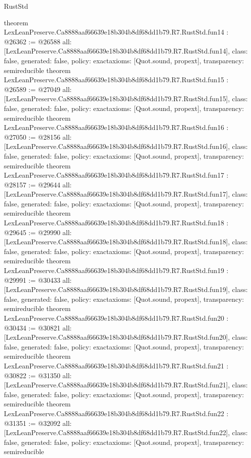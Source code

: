\begin{lexlean}{RustStd}
\begin{coremodule}
{}
theorem LexLeanPreserve.Ca8888aaf66639e18b304b8df68dd1b79.R7.RustStd.fun14 : @26362 := @26588 {
  all: [LexLeanPreserve.Ca8888aaf66639e18b304b8df68dd1b79.R7.RustStd.fun14],
  class: false,
  generated: false,
  policy: exact{axioms: [Quot.sound, propext]},
  transparency: semireducible
}
theorem LexLeanPreserve.Ca8888aaf66639e18b304b8df68dd1b79.R7.RustStd.fun15 : @26589 := @27049 {
  all: [LexLeanPreserve.Ca8888aaf66639e18b304b8df68dd1b79.R7.RustStd.fun15],
  class: false,
  generated: false,
  policy: exact{axioms: [Quot.sound, propext]},
  transparency: semireducible
}
theorem LexLeanPreserve.Ca8888aaf66639e18b304b8df68dd1b79.R7.RustStd.fun16 : @27050 := @28156 {
  all: [LexLeanPreserve.Ca8888aaf66639e18b304b8df68dd1b79.R7.RustStd.fun16],
  class: false,
  generated: false,
  policy: exact{axioms: [Quot.sound, propext]},
  transparency: semireducible
}
theorem LexLeanPreserve.Ca8888aaf66639e18b304b8df68dd1b79.R7.RustStd.fun17 : @28157 := @29644 {
  all: [LexLeanPreserve.Ca8888aaf66639e18b304b8df68dd1b79.R7.RustStd.fun17],
  class: false,
  generated: false,
  policy: exact{axioms: [Quot.sound, propext]},
  transparency: semireducible
}
theorem LexLeanPreserve.Ca8888aaf66639e18b304b8df68dd1b79.R7.RustStd.fun18 : @29645 := @29990 {
  all: [LexLeanPreserve.Ca8888aaf66639e18b304b8df68dd1b79.R7.RustStd.fun18],
  class: false,
  generated: false,
  policy: exact{axioms: [Quot.sound, propext]},
  transparency: semireducible
}
theorem LexLeanPreserve.Ca8888aaf66639e18b304b8df68dd1b79.R7.RustStd.fun19 : @29991 := @30433 {
  all: [LexLeanPreserve.Ca8888aaf66639e18b304b8df68dd1b79.R7.RustStd.fun19],
  class: false,
  generated: false,
  policy: exact{axioms: [Quot.sound, propext]},
  transparency: semireducible
}
theorem LexLeanPreserve.Ca8888aaf66639e18b304b8df68dd1b79.R7.RustStd.fun20 : @30434 := @30821 {
  all: [LexLeanPreserve.Ca8888aaf66639e18b304b8df68dd1b79.R7.RustStd.fun20],
  class: false,
  generated: false,
  policy: exact{axioms: [Quot.sound, propext]},
  transparency: semireducible
}
theorem LexLeanPreserve.Ca8888aaf66639e18b304b8df68dd1b79.R7.RustStd.fun21 : @30822 := @31350 {
  all: [LexLeanPreserve.Ca8888aaf66639e18b304b8df68dd1b79.R7.RustStd.fun21],
  class: false,
  generated: false,
  policy: exact{axioms: [Quot.sound, propext]},
  transparency: semireducible
}
theorem LexLeanPreserve.Ca8888aaf66639e18b304b8df68dd1b79.R7.RustStd.fun22 : @31351 := @32092 {
  all: [LexLeanPreserve.Ca8888aaf66639e18b304b8df68dd1b79.R7.RustStd.fun22],
  class: false,
  generated: false,
  policy: exact{axioms: [Quot.sound, propext]},
  transparency: semireducible
}
\end{coremodule}
\end{lexlean}
